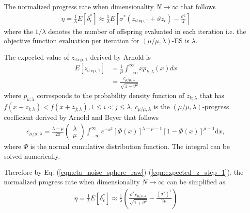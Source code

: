 The normalized progress rate when dimensionality $N \rightarrow \infty$ that follows 
\begin{align}\label{eqn:eta_noise_sphere_raw}{}
\eta = \frac{1}{\lambda}E[ \delta_\epsilon^*] \approx \frac{1}{\lambda} E \left[ \sigma^* (z_{\text{step},1} + \vartheta z_\epsilon ) - \frac{\sigma^2}{2}  \right]
\end{align}
where the $1/\lambda$ denotes the number of offspring evaluated in each iteration i.e. the objective function evaluation per iteration for $(\mu/\mu,\lambda)$-ES is $\lambda$.

The expected value of $z_{\text{step},1}$ derived by Arnold \cite{ARNOLD2001127} is
\begin{align}\label{eqn:expected_z_step_1}{}
E[z_{\text{step},1}] &= \frac{1}{\mu} \int_{-\infty}^\infty x p_{k;\lambda}(x)dx \\
& = \frac{c_{\mu/\mu,\lambda}}{\sqrt{1+ \vartheta^2}}
\end{align}
where $p_{k;\lambda}$ corresponds to the probability density function of $z_{k;\lambda}$ that has $f(x+z_{i;\lambda})<f(x+z_{j;\lambda}), 1 \leq i<j \leq \lambda$, $c_{\mu/\mu,\lambda}$ is the $(\mu/\mu,\lambda)$-progress coefficient derived by Arnold and Beyer \cite{Arnold:2000:EMS:645825.669117} that follows
\begin{align}\label{eqn:c_mu_mu_lambda}
c_{\mu/\mu,\lambda}  = \frac{\lambda-\mu}{2 \pi} \begin{pmatrix} \lambda \\ \mu \end{pmatrix} \int_{-\infty}^{\infty} e^{-x^2}   \left [ \Phi(x)\right]^{\lambda-\mu-1}  \left[ 1- \Phi (x) \right]^{\mu-1}  \text{d} x,
\end{align}
where $\Phi$ is the normal cumulative distribution function. The integral can be solved numerically.  

Therefore by Eq. (\ref{eqn:eta_noise_sphere_raw}) (\ref{eqn:expected_z_step_1}), the normalized progress rate when dimensionality $N \rightarrow \infty$ can be simplified as
\begin{align}\label{eqn:eta_noise_sphere}{}
\eta = \frac{1}{\lambda}E[ \delta_\epsilon^*] \approx \frac{1}{\lambda} \left( \frac{\sigma^* c_{\mu / \mu, \lambda}}{\sqrt {1+ \vartheta^2}} - \frac{(\sigma^*)^2}{2 \mu} \right)
\end{align}



